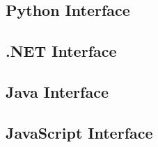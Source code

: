 \documentclass{book}
\begin{document}
\begin{pycpdflib}
\clearpage
\section*{Python Interface}
\begin{small}\tt

\end{small}
\end{pycpdflib}

\begin{dotnetcpdflib}
\clearpage
\section*{.NET Interface}
\begin{small}\tt

\end{small}
\end{dotnetcpdflib}

\begin{jcpdflib}
\clearpage
\section*{Java Interface}
\begin{small}\tt

\end{small}
\end{jcpdflib}

\begin{jscpdflib}
\clearpage
\section*{JavaScript Interface}
\begin{small}\tt

\end{small}
\end{jscpdflib}
\end{document}
